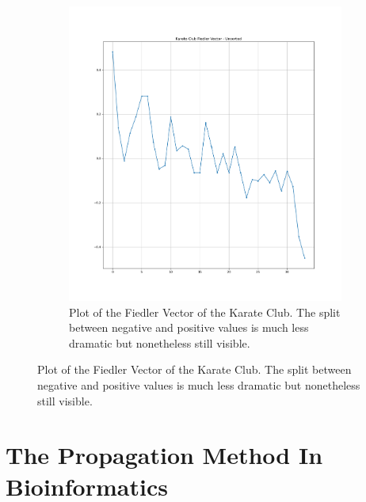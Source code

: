 \documentclass[a4paper,10pt]{article}
\theoremstyle{definition}
\theoremstyle{remark}
\theoremstyle{plain}
\begin{document}
\begin{figure}
\begin{subfigure}[b]{0.5\textwidth}
\includegraphics[width=\textwidth]{karate_fiedler_unsorted.png}
\caption{Plot of the Fiedler Vector of the Karate Club. The split between
negative and positive values is much less dramatic but nonetheless still visible.}
\label{fig:karatefiedlerplot}
\end{subfigure}
\end{figure}


\section{The Propagation Method In Bioinformatics}
%

\end{document}
